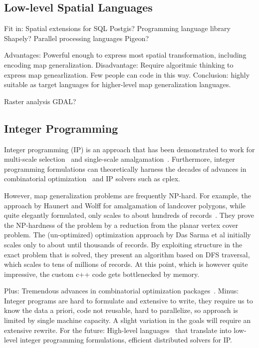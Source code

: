 \documentclass[11pt, oneside]{report}
\begin{document}
{\subsection{Low-level Spatial Languages}

Fit in: Spatial extensions for SQL Postgis? Programming language library Shapely? Parallel processing languages Pigeon?

Advantages: Powerful enough to express most spatial transformation, including encoding map generalization. Disadvantage: Require algoritmic thinking to express map genearlization. Few people can code in this way. Conclusion: highly suitable as target languages for higher-level map generalization languages.


Raster analysis GDAL?

\subsection{Integer Programming}

Integer programming (IP) is an approach that has been demonstrated to work for multi-scale selection~\cite{sarma2012fusiontables} and single-scale amalgamation~\cite{haunert2006landcover}. Furthermore, integer programming formulations can theoretically harness the decades of advances in combinatorial optimization~\cite{branchandbound} and IP solvers such as cplex.

However, map generalization problems are frequently NP-hard. For example, the approach by Haunert and Wolff for amalgamation of landcover polygons, while quite elegantly formulated, only scales to about hundreds of records~\cite{haunert2006landcover}. They prove the NP-hardness of the problem by a reduction from the planar vertex cover problem. The (un-optimized) optimization approach by Das Sarma et al initially scales only to about until thousands of records. By exploiting structure in the exact problem that is solved, they present an algorithm based on DFS traversal, which scales to tens of millions of records. At this point, which is however quite impressive, the custom c++ code gets bottlenecked by memory.

Plus: Tremendous advances in combinatorial optimization packages~\cite{cplex}.
Minus: Integer programs are hard to formulate and extensive to write, they require us to know the data a priori, code not reusable, hard to parallelize, so approach is limited by single machine capacity. A slight variation in the goals will require an extensive rewrite.
For the future: High-level languages~\cite{meliou2011reverse} that translate into low-level integer programming formulations, efficient distributed solvers for IP.

}
\end{document}
